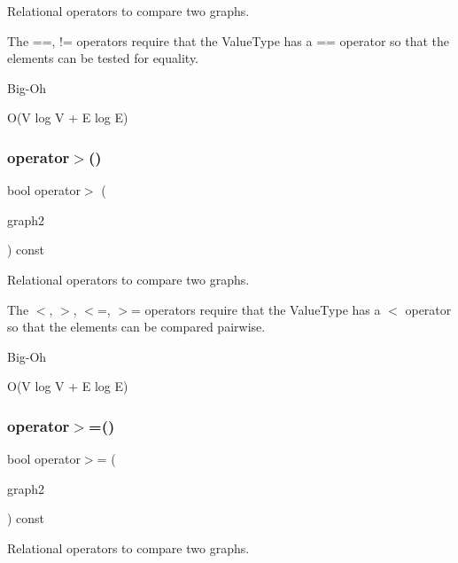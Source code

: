 Relational operators to compare two graphs. 

The ==, != operators require that the Value\+Type has a == operator so that the elements can be tested for equality. \begin{DoxyRefDesc}{Big-\/\+Oh}
\item[\mbox{\hyperlink{BigOh__BigOh000093}{Big-\/\+Oh}}]O(V log V + E log E) \end{DoxyRefDesc}
\mbox{\label{classGraph_a8019cf2c98949fd509193cf26ba2ff8a}} 
\subsubsection{\texorpdfstring{operator$>$()}{operator>()}}
{\footnotesize\ttfamily bool operator$>$ (\begin{DoxyParamCaption}\item[{const \mbox{\hyperlink{classGraph}{Graph}}$<$ Node\+Type, Arc\+Type $>$ \&}]{graph2 }\end{DoxyParamCaption}) const}



Relational operators to compare two graphs. 

The $<$, $>$, $<$=, $>$= operators require that the Value\+Type has a $<$ operator so that the elements can be compared pairwise. \begin{DoxyRefDesc}{Big-\/\+Oh}
\item[\mbox{\hyperlink{BigOh__BigOh000097}{Big-\/\+Oh}}]O(V log V + E log E) \end{DoxyRefDesc}
\mbox{\label{classGraph_ab1ca2af20f3b0251972b72295270212e}} 
\subsubsection{\texorpdfstring{operator$>$=()}{operator>=()}}
{\footnotesize\ttfamily bool operator$>$= (\begin{DoxyParamCaption}\item[{const \mbox{\hyperlink{classGraph}{Graph}}$<$ Node\+Type, Arc\+Type $>$ \&}]{graph2 }\end{DoxyParamCaption}) const}



Relational operators to compare two graphs. 

